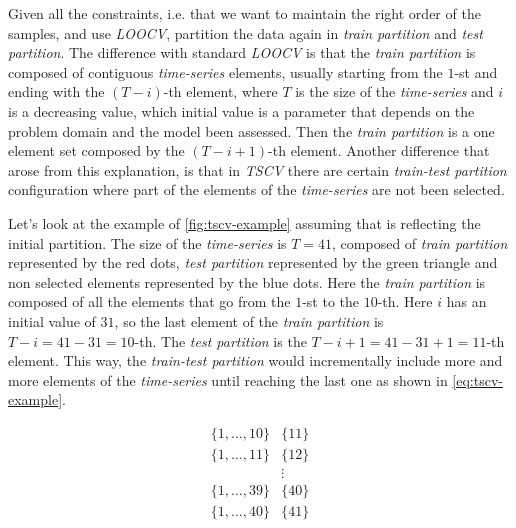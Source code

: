 Given all the constraints, i.e. that we want to maintain the right
order of the samples, and use \textit{LOOCV}, partition the data again
in \textit{train partition} and \textit{test partition}. The
difference with standard \textit{LOOCV} is that the \textit{train
partition} is composed of contiguous \textit{time-series} elements,
usually starting from the $1$-st and ending with the $(T - i)$-th
element, where $T$ is the size of the \textit{time-series} and $i$ is
a decreasing value, which initial value is a parameter that depends on
the problem domain and the model been assessed. Then the \textit{train
partition} is a one element set composed by the $(T - i + 1)$-th
element. Another difference that arose from this explanation, is that
in \textit{TSCV} there are certain \textit{train-test partition}
configuration where part of the elements of the \textit{time-series}
are not been selected.

Let's look at the example of \autoref{fig:tscv-example} assuming that
is reflecting the initial partition. The size of the
\textit{time-series} is $T = 41$, composed of \textit{train partition}
represented by the red dots, \textit{test partition} represented by
the green triangle and non selected elements represented by the blue
dots. Here the \textit{train partition} is composed of all the
elements that go from the $1$-st to the $10$-th. Here $i$ has an
initial value of $31$, so the last element of the \textit{train
partition} is $T - i = 41 - 31 = 10$-th. The \textit{test partition}
is the $T - i + 1 = 41 - 31 + 1 = 11$-th element. This way, the
\textit{train-test partition} would incrementally include more and
more elements of the \textit{time-series} until reaching the last one
as shown in \autoref{eq:tscv-example}.

\begin{equation}
  \begin{aligned}
    \label{eq:tscv-example}
    \{1,\dots,10\} & \{11\} \\
    \{1,\dots,11\} & \{12\} \\
    &\vdots \\
    \{1,\dots,39\} & \{40\} \\
    \{1,\dots,40\} & \{41\} \\
  \end{aligned}
\end{equation}

